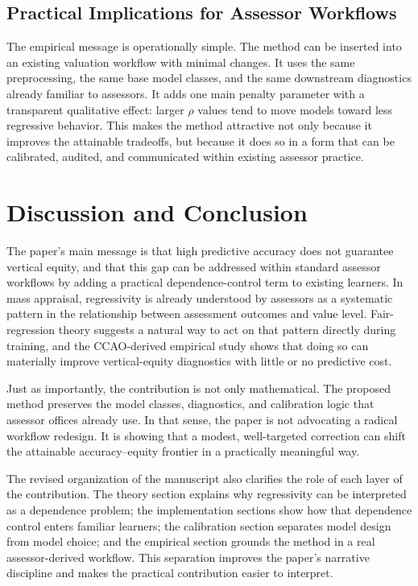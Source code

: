 \documentclass[12pt]{article}
\theoremstyle{plain}
\theoremstyle{definition}
\begin{document}
\subsection{Practical Implications for Assessor Workflows}

The empirical message is operationally simple. The method can be inserted into an existing valuation workflow with minimal changes. It uses the same preprocessing, the same base model classes, and the same downstream diagnostics already familiar to assessors. It adds one main penalty parameter with a transparent qualitative effect: larger \(\rho\) values tend to move models toward less regressive behavior. This makes the method attractive not only because it improves the attainable tradeoffs, but because it does so in a form that can be calibrated, audited, and communicated within existing assessor practice.



\section{Discussion and Conclusion}
\label{sec:discussion}

The paper's main message is that high predictive accuracy does not guarantee vertical equity, and that this gap can be addressed within standard assessor workflows by adding a practical dependence-control term to existing learners. In mass appraisal, regressivity is already understood by assessors as a systematic pattern in the relationship between assessment outcomes and value level. Fair-regression theory suggests a natural way to act on that pattern directly during training, and the CCAO-derived empirical study shows that doing so can materially improve vertical-equity diagnostics with little or no predictive cost.

Just as importantly, the contribution is not only mathematical. The proposed method preserves the model classes, diagnostics, and calibration logic that assessor offices already use. In that sense, the paper is not advocating a radical workflow redesign. It is showing that a modest, well-targeted correction can shift the attainable accuracy--equity frontier in a practically meaningful way.

The revised organization of the manuscript also clarifies the role of each layer of the contribution. The theory section explains why regressivity can be interpreted as a dependence problem; the implementation sections show how that dependence control enters familiar learners; the calibration section separates model design from model choice; and the empirical section grounds the method in a real assessor-derived workflow. This separation improves the paper's narrative discipline and makes the practical contribution easier to interpret.
\end{document}
